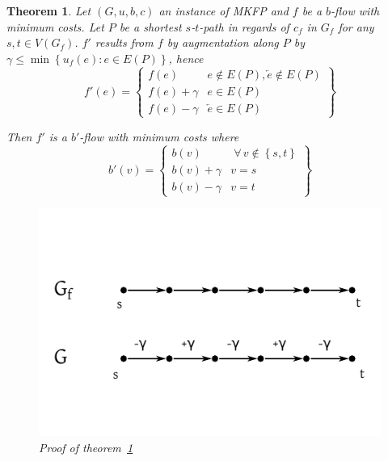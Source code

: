 \documentclass{article}
\newtheorem{theorem}{Theorem}
\newcommand{\set}[1]{\left\{#1\right\}}
\newcommand{\gath}[2]{$#1$-$#2$-path} %
\newcommand{\fall}{\;\forall\,}
\begin{document}
\begin{theorem}\label{satz-5.8}
  Let $(G, u, b, c)$ an instance of MKFP and $f$ be a $b$-flow with minimum costs.
  Let $P$ be a shortest \gath st in regards of $c_f$ in $G_f$ for any $s, t \in V(G_f)$.
  $f'$ results from $f$ by augmentation along $P$ by $\gamma \leq \min\set{u_f(e): e \in E(P)}$,
  hence
  \[
    f'(e) = \left\{\begin{array}{lc}
      f(e) & e \notin E(P), \overleftarrow{e} \notin E(P) \\
      f(e) + \gamma & e \in E(P) \\
      f(e) - \gamma & \overleftarrow{e} \in E(P)
    \end{array}\right\}
  \]

  Then $f'$ is a $b'$-flow with minimum costs where
  \[
    b'(v) = \left\{\begin{array}{lc}
      b(v) & \fall v \notin \set{s,t} \\
      b(v) + \gamma & v = s \\
      b(v) - \gamma & v = t
    \end{array}\right\}
  \]

  \begin{figure}[ht]
   \begin{center}
    \includegraphics{img/satz_5_8.pdf}
    \caption{Proof of theorem~\ref{satz-5.8}}
   \end{center}
  \end{figure}
\end{theorem}
\end{document}
